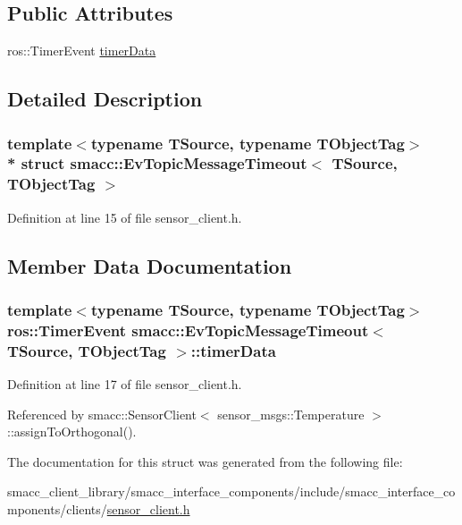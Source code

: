 \subsection*{Public Attributes}
\begin{DoxyCompactItemize}
\item 
ros\+::\+Timer\+Event \hyperlink{structsmacc_1_1EvTopicMessageTimeout_ad2609ece9742ef84c32160309b1b0f15}{timer\+Data}
\end{DoxyCompactItemize}


\subsection{Detailed Description}
\subsubsection*{template$<$typename T\+Source, typename T\+Object\+Tag$>$\\*
struct smacc\+::\+Ev\+Topic\+Message\+Timeout$<$ T\+Source, T\+Object\+Tag $>$}



Definition at line 15 of file sensor\+\_\+client.\+h.



\subsection{Member Data Documentation}
\subsubsection[{\texorpdfstring{timer\+Data}{timerData}}]{\setlength{\rightskip}{0pt plus 5cm}template$<$typename T\+Source, typename T\+Object\+Tag$>$ ros\+::\+Timer\+Event {\bf smacc\+::\+Ev\+Topic\+Message\+Timeout}$<$ T\+Source, T\+Object\+Tag $>$\+::timer\+Data}\hypertarget{structsmacc_1_1EvTopicMessageTimeout_ad2609ece9742ef84c32160309b1b0f15}{}\label{structsmacc_1_1EvTopicMessageTimeout_ad2609ece9742ef84c32160309b1b0f15}


Definition at line 17 of file sensor\+\_\+client.\+h.



Referenced by smacc\+::\+Sensor\+Client$<$ sensor\+\_\+msgs\+::\+Temperature $>$\+::assign\+To\+Orthogonal().



The documentation for this struct was generated from the following file\+:\begin{DoxyCompactItemize}
\item 
smacc\+\_\+client\+\_\+library/smacc\+\_\+interface\+\_\+components/include/smacc\+\_\+interface\+\_\+components/clients/\hyperlink{sensor__client_8h}{sensor\+\_\+client.\+h}\end{DoxyCompactItemize}
